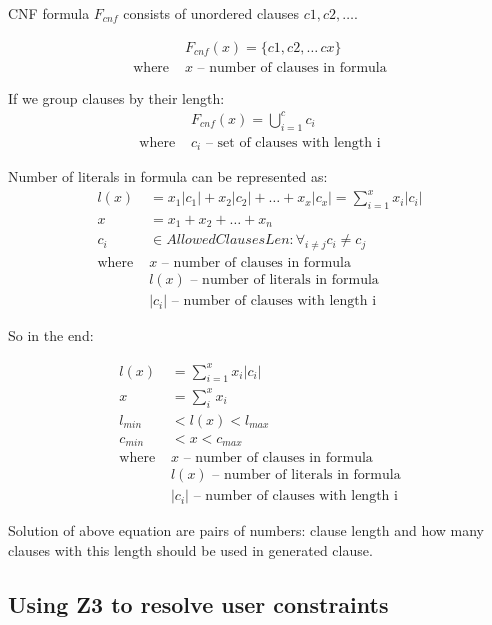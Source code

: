 CNF formula $F_{cnf}$ consists of unordered clauses $c1, c2, \dots$. 

\begin{align*}
	&F_{cnf}(x) = \{c1, c2, \dots\, cx\} \\
	\text{where }
		&x \text{ -- number of clauses in formula}
\end{align*}

If we group clauses by their length:
\begin{align*}
	&F_{cnf}(x) = \bigcup_{i=1}^c c_i \\
	\text{where }
		&c_i \text{ -- set of clauses with length i} 
\end{align*}

Number of literals in formula can be represented as:
\begin{align*}
	l(x) &= x_1|c_1| + x_2|c_2| + \dots + x_x|c_x| = \sum_{i=1}^{x} x_i |c_i| \\
	x &= x_1 + x_2 + \dots + x_n \\
	c_i &\in AllowedClausesLen: \forall_{i \neq j} c_i \neq c_j  \\
	\text{where }
		&x \text{ -- number of clauses in formula} \\ 
		&l(x) \text{ -- number of literals in formula} \\ 
		&|c_i| \text{ -- number of clauses with length i} 
\end{align*}

So in the end:

\begin{align}
  l(x) &= \sum_{i=1}^{x} x_i |c_i|\label{eq:UserConstraintsLx} \\
  x &= \sum_i^x x_i\label{eq:UserConstraintsX} \\
  l_{min} &< l(x) < l_{max} \label{eq:UserConstraintsRangeL}\\
  c_{min} &< x < c_{max}\label{eq:UserConstraintsRangeC} \\
	\text{where } 
		&x \text{ -- number of clauses in formula} \nonumber \\
		&l(x) \text{ -- number of literals in formula} \nonumber  \\
		&|c_i| \text{ -- number of clauses with length i} \nonumber
\end{align}

Solution of above equation are pairs of numbers: clause length and how many clauses with this length should be used in generated clause.

\subsection{Using Z3 to resolve user constraints}

